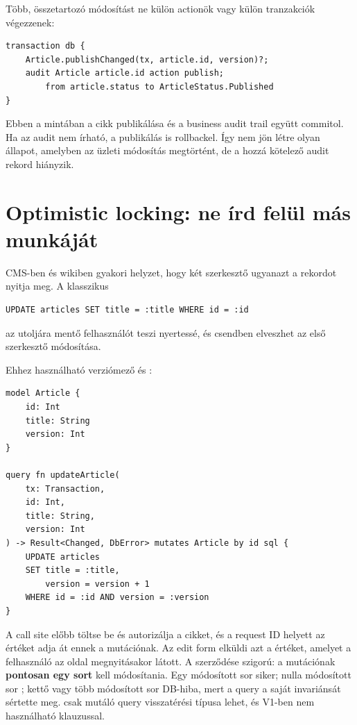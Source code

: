 Több, összetartozó módosítást ne külön actionök vagy külön tranzakciók végezzenek:

\begin{lstlisting}[language=RWLang]
transaction db {
    Article.publishChanged(tx, article.id, version)?;
    audit Article article.id action publish;
        from article.status to ArticleStatus.Published
}
\end{lstlisting}

Ebben a mintában a cikk publikálása és a business audit trail együtt commitol. Ha az audit nem írható, a publikálás is rollbackel. Így nem jön létre olyan állapot, amelyben az üzleti módosítás megtörtént, de a hozzá kötelező audit rekord hiányzik.

\section{Optimistic locking: ne írd felül más munkáját}

CMS-ben és wikiben gyakori helyzet, hogy két szerkesztő ugyanazt a rekordot nyitja meg. A klasszikus

\begin{lstlisting}
UPDATE articles SET title = :title WHERE id = :id
\end{lstlisting}

az utoljára mentő felhasználót teszi nyertessé, és csendben elveszhet az első szerkesztő módosítása.

Ehhez használható verziómező és :

\begin{lstlisting}[language=RWLang]
model Article {
    id: Int
    title: String
    version: Int
}

query fn updateArticle(
    tx: Transaction,
    id: Int,
    title: String,
    version: Int
) -> Result<Changed, DbError> mutates Article by id sql {
    UPDATE articles
    SET title = :title,
        version = version + 1
    WHERE id = :id AND version = :version
}
\end{lstlisting}

A call site előbb töltse be és autorizálja a cikket, és a request ID helyett az  értéket adja át ennek a mutációnak. Az edit form elküldi azt a  értéket, amelyet a felhasználó az oldal megnyitásakor látott. A  szerződése szigorú: a mutációnak \textbf{pontosan egy sort} kell módosítania. Egy módosított sor siker; nulla módosított sor ; kettő vagy több módosított sor DB-hiba, mert a query a saját invariánsát sértette meg.  csak mutáló query visszatérési típusa lehet, és V1-ben nem használható  klauzussal.

